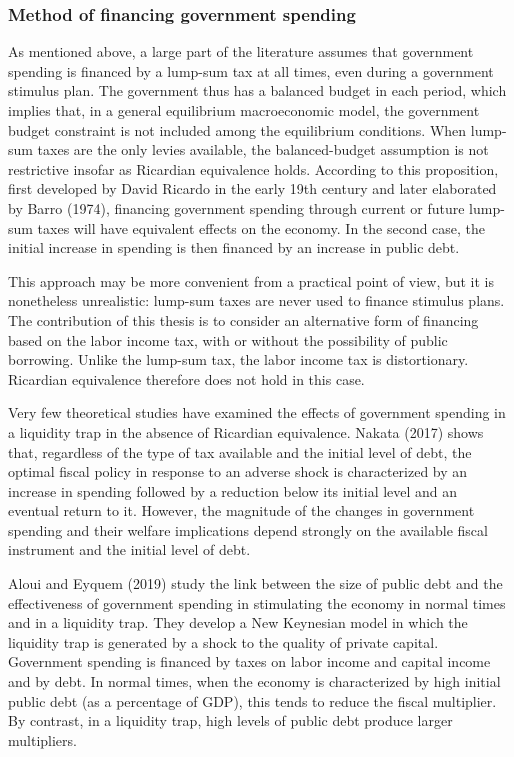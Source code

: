 \documentclass[12pt,letterpaper]{article}
\begin{document}
\subsubsection{Method of financing government spending}

As mentioned above, a large part of the literature assumes that government spending is financed by a lump-sum tax at all times, even during a government stimulus plan. The government thus has a balanced budget in each period, which implies that, in a general equilibrium macroeconomic model, the government budget constraint is not included among the equilibrium conditions. When lump-sum taxes are the only levies available, the balanced-budget assumption is not restrictive insofar as Ricardian equivalence holds. According to this proposition, first developed by David Ricardo in the early 19th century and later elaborated by Barro (1974), financing government spending through current or future lump-sum taxes will have equivalent effects on the economy. In the second case, the initial increase in spending is then financed by an increase in public debt.

This approach may be more convenient from a practical point of view, but it is nonetheless unrealistic: lump-sum taxes are never used to finance stimulus plans. The contribution of this thesis is to consider an alternative form of financing based on the labor income tax, with or without the possibility of public borrowing. Unlike the lump-sum tax, the labor income tax is distortionary. Ricardian equivalence therefore does not hold in this case.

Very few theoretical studies have examined the effects of government spending in a liquidity trap in the absence of Ricardian equivalence. Nakata (2017) shows that, regardless of the type of tax available and the initial level of debt, the optimal fiscal policy in response to an adverse shock is characterized by an increase in spending followed by a reduction below its initial level and an eventual return to it. However, the magnitude of the changes in government spending and their welfare implications depend strongly on the available fiscal instrument and the initial level of debt.

Aloui and Eyquem (2019) study the link between the size of public debt and the effectiveness of government spending in stimulating the economy in normal times and in a liquidity trap. They develop a New Keynesian model in which the liquidity trap is generated by a shock to the quality of private capital. Government spending is financed by taxes on labor income and capital income and by debt. In normal times, when the economy is characterized by high initial public debt (as a percentage of GDP), this tends to reduce the fiscal multiplier. By contrast, in a liquidity trap, high levels of public debt produce larger multipliers.
\end{document}
